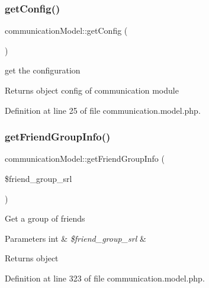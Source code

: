 \mbox{\label{classcommunicationModel_ac19b1522d651d098b2d1a6f449a7b340}} 
\subsubsection{\texorpdfstring{get\+Config()}{getConfig()}}
{\footnotesize\ttfamily communication\+Model\+::get\+Config (\begin{DoxyParamCaption}{ }\end{DoxyParamCaption})}

get the configuration \begin{DoxyReturn}{Returns}
object config of communication module 
\end{DoxyReturn}


Definition at line 25 of file communication.\+model.\+php.

\mbox{\label{classcommunicationModel_a4ccd810d8c48ef4856da8fe986beb60a}} 
\subsubsection{\texorpdfstring{get\+Friend\+Group\+Info()}{getFriendGroupInfo()}}
{\footnotesize\ttfamily communication\+Model\+::get\+Friend\+Group\+Info (\begin{DoxyParamCaption}\item[{}]{\$friend\+\_\+group\+\_\+srl }\end{DoxyParamCaption})}

Get a group of friends 
\begin{DoxyParams}[1]{Parameters}
int & {\em \$friend\+\_\+group\+\_\+srl} & \\
\hline
\end{DoxyParams}
\begin{DoxyReturn}{Returns}
object 
\end{DoxyReturn}


Definition at line 323 of file communication.\+model.\+php.

\mbox{\label{classcommunicationModel_a670b024aba464aee04e81fd2ae846fc5}} 
